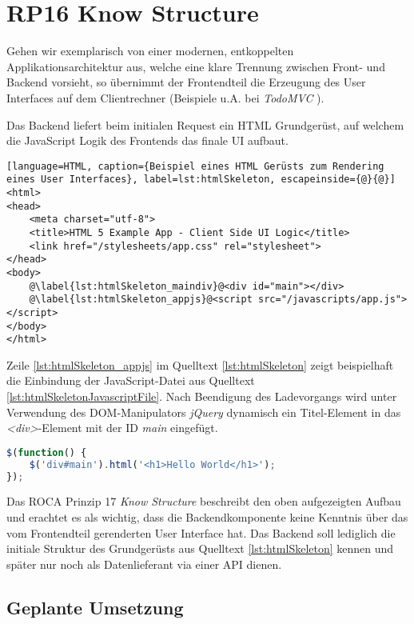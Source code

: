 \section{RP16 Know Structure}
\label{sec:principle-rp16-know-structure}

Gehen wir exemplarisch von einer modernen, entkoppelten Applikationsarchitektur aus, welche eine klare Trennung zwischen Front- und Backend vorsieht, so übernimmt der Frontendteil die Erzeugung des User Interfaces auf dem Clientrechner (Beispiele u.A. bei \emph{TodoMVC} \cite{TodoMVC}).

Das Backend liefert beim initialen Request ein HTML Grundgerüst, auf welchem die JavaScript Logik des Frontends das finale UI aufbaut.

\begin{lstlisting}[language=HTML, caption={Beispiel eines HTML Gerüsts zum Rendering eines User Interfaces}, label=lst:htmlSkeleton, escapeinside={@}{@}]
<html>
<head>
	<meta charset="utf-8">
	<title>HTML 5 Example App - Client Side UI Logic</title>
	<link href="/stylesheets/app.css" rel="stylesheet">
</head>
<body>
	@\label{lst:htmlSkeleton_maindiv}@<div id="main"></div>
	@\label{lst:htmlSkeleton_appjs}@<script src="/javascripts/app.js"></script>
</body>
</html>
\end{lstlisting}

Zeile \autoref{lst:htmlSkeleton_appjs} im Quelltext \ref{lst:htmlSkeleton} zeigt beispielhaft die Einbindung der JavaScript-Datei aus Quelltext \ref{lst:htmlSkeletonJavascriptFile}. Nach Beendigung des Ladevorgangs wird unter Verwendung des \gls{DOM}-Manipulators \emph{jQuery} \cite{jQuery} dynamisch ein Titel-Element in das \emph{<div>}-Element mit der ID \emph{main} eingefügt.

\begin{lstlisting}[language=JavaScript, caption={JavaScript-Datei \emph{app.js} zu Quelltext \ref{lst:htmlSkeleton}}, label=lst:htmlSkeletonJavascriptFile]
$(function() {
	$('div#main').html('<h1>Hello World</h1>');
});
\end{lstlisting}

Das ROCA Prinzip 17 \emph{Know Structure} beschreibt den oben aufgezeigten Aufbau und erachtet es als wichtig, dass die Backendkomponente keine Kenntnis über das vom Frontendteil gerenderten User Interface hat. Das Backend soll lediglich die initiale Struktur des Grundgerüsts aus Quelltext \ref{lst:htmlSkeleton} kennen und später nur noch als Datenlieferant via einer API dienen.


\subsection*{Geplante Umsetzung}

